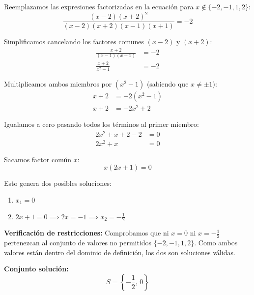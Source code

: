 \documentclass[11pt]{article}
\begin{document}
\begin{enumerate}
\begin{enumerate}
            Reemplazamos las expresiones factorizadas en la ecuación para $x \notin \{-2, -1, 1, 2\}$:
            \begin{equation*}
                \frac{(x - 2)(x + 2)^2}{(x - 2)(x + 2)(x - 1)(x + 1)} = -2
            \end{equation*}

            Simplificamos cancelando los factores comunes $(x - 2)$ y $(x + 2)$:
            \begin{align*}
                \frac{x + 2}{(x - 1)(x + 1)} &= -2 \\
                \frac{x + 2}{x^2 - 1} &= -2
            \end{align*}

            Multiplicamos ambos miembros por $(x^2 - 1)$ (sabiendo que $x \neq \pm 1$):
            \begin{align*}
                x + 2 &= -2(x^2 - 1) \\
                x + 2 &= -2x^2 + 2
            \end{align*}

            Igualamos a cero pasando todos los términos al primer miembro:
            \begin{align*}
                2x^2 + x + 2 - 2 &= 0 \\
                2x^2 + x &= 0
            \end{align*}

            Sacamos factor común $x$:
            \begin{equation*}
                x(2x + 1) = 0
            \end{equation*}

            Esto genera dos posibles soluciones:
            \begin{enumerate}
                \item $x_1 = 0$
                \item $2x + 1 = 0 \implies 2x = -1 \implies x_2 = -\frac{1}{2}$
            \end{enumerate}
        \vspace{0.3cm}
        \textbf{Verificación de restricciones:} 
        Comprobamos que ni $x = 0$ ni $x = -\frac{1}{2}$ pertenezcan al conjunto de valores no permitidos $\{-2, -1, 1, 2\}$. Como ambos valores están dentro del dominio de definición, los dos son soluciones válidas.

        \vspace{0.3cm}
        \noindent \textbf{Conjunto solución:}
        \begin{equation*}
            S = \left\{ -\frac{1}{2}, \, 0 \right\}
        \end{equation*}
    \end{enumerate}
\end{enumerate}
\end{document}
